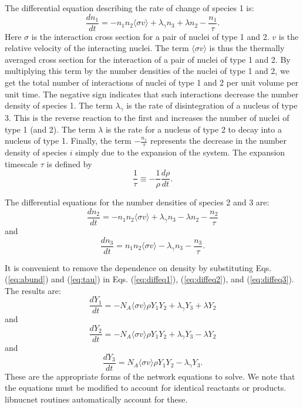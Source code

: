 \documentclass{article}    %
\begin{document}
The differential equation describing the rate of change of species 1
is:
\begin{equation}
\frac{dn_1}{dt} = -n_1 n_2 \langle \sigma v \rangle + \lambda_\gamma
n_3 + \lambda n_2 - \frac{n_1}{\tau}.  \label{eq:diffeq1}
\end{equation}
Here $\sigma$ is the interaction cross section for a pair of nuclei
of type 1 and 2.  $v$ is the relative velocity of the interacting
nuclei.  The term $\langle \sigma v \rangle$ is thus the thermally
averaged cross section for the interaction of a pair of nuclei of
type 1 and 2.  By multiplying this term by the number densities of
the nuclei of type 1 and 2, we get the total number of interactions
of nuclei of type 1 and 2 per unit volume per unit time.   The
negative sign indicates that such interactions decrease the number
density of species 1.  The term $\lambda_\gamma$ is the rate of
disintegration of a nucleus of type 3.  This is the reverse reaction
to the first and increases the number of nuclei of type 1 (and 2).
The term $\lambda$ is the rate for a nucleus of type 2 to decay into
a nucleus of type 1.  Finally, the term $-\frac{n_1}{\tau}$
represents the decrease in the number density of species $i$ simply
due to the expansion of the system.  The expansion timescale $\tau$
is defined by
\begin{equation}
\frac{1}{\tau} \equiv -\frac{1}{\rho}\frac{d\rho}{dt}.
\label{eq:tau}
\end{equation}

The differential equations for the number densities of species 2 and
3 are:
\begin{equation}
\frac{dn_2}{dt} = -n_1 n_2 \langle \sigma v \rangle + \lambda_\gamma
n_3 - \lambda n_2 - \frac{n_2}{\tau}  \label{eq:diffeq2}
\end{equation}
and
\begin{equation}
\frac{dn_3}{dt} = n_1 n_2 \langle \sigma v \rangle - \lambda_\gamma
n_3 - \frac{n_3}{\tau}. \label{eq:diffeq3}
\end{equation}

It is convenient to remove the dependence on density by substituting
Eqs. (\ref{eq:abund}) and (\ref{eq:tau}) in Eqs. (\ref{eq:diffeq1}),
(\ref{eq:diffeq2}), and (\ref{eq:diffeq3}).  The results are:
\begin{equation}
\frac{dY_1}{dt} = -N_A \langle \sigma v \rangle \rho Y_1 Y_2 +
\lambda_\gamma Y_3 + \lambda Y_2 \label{eq:diffYeq1}
\end{equation}
and
\begin{equation}
\frac{dY_2}{dt} = -N_A \langle \sigma v \rangle \rho Y_1 Y_2 +
\lambda_\gamma Y_3 - \lambda Y_2 \label{eq:diffYeq2}
\end{equation}
and
\begin{equation}
\frac{dY_3}{dt} = N_A \langle \sigma v \rangle \rho Y_1 Y_2 -
\lambda_\gamma Y_3. \label{eq:diffYeq3}
\end{equation}
These are the appropriate forms of the network equations to solve.  We note 
that the equations must be modified to account for identical reactants
or products.  libnucnet routines automatically account for these.
\end{document}

